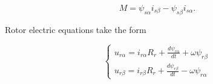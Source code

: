 \documentclass[11pt,a4paper,oneside]{report}
\begin{document}
\begin{equation}
	M = \psi_{s\alpha}i_{s\beta}-\psi_{s\beta}i_{s\alpha}.
\end{equation}

Rotor electric equations take the form

\begin{equation}
	\left\{
	\begin{split}
		u_{r\alpha} = i_{r\alpha}R_r+\frac{d\psi_{r\alpha}}{dt}+\omega\psi_{r\beta}\\
		u_{r\beta} = i_{r\beta}R_r+\frac{d\psi_{r\beta}}{dt}-\omega\psi_{r\alpha}
	\end{split}
	\right.
\end{equation}






	
\end{document}
